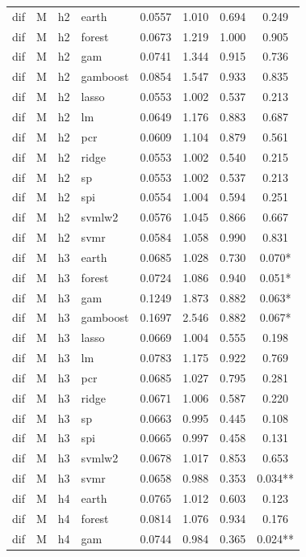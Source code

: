 \begin{ThreePartTable}
\begin{longtable}[t]{llclcccc}
dif & M & h2 & earth & 0.0557 & 1.010 & 0.694 & 0.249\\
dif & M & h2 & forest & 0.0673 & 1.219 & 1.000 & 0.905\\
dif & M & h2 & gam & 0.0741 & 1.344 & 0.915 & 0.736\\
dif & M & h2 & gamboost & 0.0854 & 1.547 & 0.933 & 0.835\\
dif & M & h2 & lasso & 0.0553 & 1.002 & 0.537 & 0.213\\
dif & M & h2 & lm & 0.0649 & 1.176 & 0.883 & 0.687\\
dif & M & h2 & pcr & 0.0609 & 1.104 & 0.879 & 0.561\\
dif & M & h2 & ridge & 0.0553 & 1.002 & 0.540 & 0.215\\
dif & M & h2 & sp & 0.0553 & 1.002 & 0.537 & 0.213\\
dif & M & h2 & spi & 0.0554 & 1.004 & 0.594 & 0.251\\
dif & M & h2 & svmlw2 & 0.0576 & 1.045 & 0.866 & 0.667\\
dif & M & h2 & svmr & 0.0584 & 1.058 & 0.990 & 0.831\\
\addlinespace
dif & M & h3 & earth & 0.0685 & 1.028 & 0.730 & 0.070*\\
dif & M & h3 & forest & 0.0724 & 1.086 & 0.940 & 0.051*\\
dif & M & h3 & gam & 0.1249 & 1.873 & 0.882 & 0.063*\\
dif & M & h3 & gamboost & 0.1697 & 2.546 & 0.882 & 0.067*\\
dif & M & h3 & lasso & 0.0669 & 1.004 & 0.555 & 0.198\\
dif & M & h3 & lm & 0.0783 & 1.175 & 0.922 & 0.769\\
dif & M & h3 & pcr & 0.0685 & 1.027 & 0.795 & 0.281\\
dif & M & h3 & ridge & 0.0671 & 1.006 & 0.587 & 0.220\\
dif & M & h3 & sp & 0.0663 & 0.995 & 0.445 & 0.108\\
dif & M & h3 & spi & 0.0665 & 0.997 & 0.458 & 0.131\\
dif & M & h3 & svmlw2 & 0.0678 & 1.017 & 0.853 & 0.653\\
dif & M & h3 & svmr & 0.0658 & 0.988 & 0.353 & 0.034**\\
\addlinespace
dif & M & h4 & earth & 0.0765 & 1.012 & 0.603 & 0.123\\
dif & M & h4 & forest & 0.0814 & 1.076 & 0.934 & 0.176\\
dif & M & h4 & gam & 0.0744 & 0.984 & 0.365 & 0.024**\\

\end{longtable}
\end{ThreePartTable}
